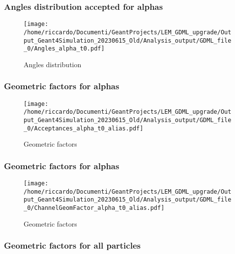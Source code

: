 \documentclass[8pt]{beamer}
\begin{document}
        \begin{frame}
            \frametitle{Angles distribution accepted for alphas}
        
        \begin{figure}[h]
            \centering
            \texttt{[image: /home/riccardo/Documenti/GeantProjects/LEM\_GDML\_upgrade/Output\_Geant4Simulation\_20230615\_Old/Analysis\_output/GDML\_file\_0/Angles\_alpha\_t0.pdf]}
            \caption{Angles distribution}
        \end{figure}
        
        \end{frame}
        
        \begin{frame}
            \frametitle{Geometric factors for alphas}
        
        \begin{figure}[h]
            \centering
            \texttt{[image: /home/riccardo/Documenti/GeantProjects/LEM\_GDML\_upgrade/Output\_Geant4Simulation\_20230615\_Old/Analysis\_output/GDML\_file\_0/Acceptances\_alpha\_t0\_alias.pdf]}
            \caption{Geometric factors}
        \end{figure}
        
        \end{frame}
        
        \begin{frame}
            \frametitle{Geometric factors for alphas}
        
        \begin{figure}[h]
            \centering
            \texttt{[image: /home/riccardo/Documenti/GeantProjects/LEM\_GDML\_upgrade/Output\_Geant4Simulation\_20230615\_Old/Analysis\_output/GDML\_file\_0/ChannelGeomFactor\_alpha\_t0\_alias.pdf]}
            \caption{Geometric factors}
        \end{figure}
        
        \end{frame}
        
        \begin{frame}
            \frametitle{Geometric factors for all particles}
        
        \end{frame}
        
        
\end{document}
